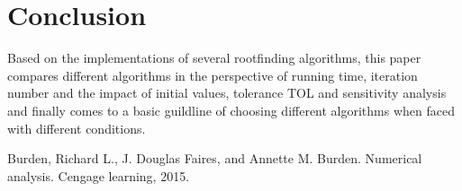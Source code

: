 \documentclass{article}
\begin{document}
\section{Conclusion}

    Based on the implementations of several rootfinding algorithms, this paper compares different algorithms in the perspective of running time, iteration number and  the impact of initial values, tolerance TOL and sensitivity analysis and finally comes to a basic guildline of choosing different algorithms when faced with different conditions.


\begin{thebibliography}{99}
 Burden, Richard L., J. Douglas Faires, and Annette M. Burden. Numerical analysis. Cengage learning, 2015.

\end{thebibliography}
\end{document}
